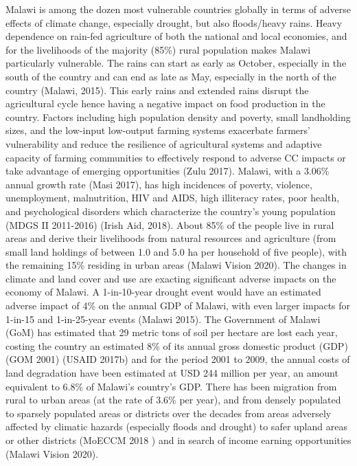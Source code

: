 \documentclass[
]{book}
\begin{document}
Malawi is among the dozen most vulnerable countries globally in terms of adverse effects of climate change, especially drought, but also floods/heavy rains. Heavy dependence on rain-fed agriculture of both the national and local economies, and for the livelihoods of the majority (85\%) rural population makes Malawi particularly vulnerable. The rains can start as early as October, especially in the south of the country and can end as late as May, especially in the north of the country (Malawi, 2015). This early rains and extended rains disrupt the agricultural cycle hence having a negative impact on food production in the country. Factors including high population density and poverty, small landholding sizes, and the low-input low-output farming systems exacerbate farmers' vulnerability and reduce the resilience of agricultural systems and adaptive capacity of farming communities to effectively respond to adverse CC impacts or take advantage of emerging opportunities (Zulu 2017). Malawi, with a 3.06\% annual growth rate (Masi 2017), has high incidences of poverty, violence, unemployment, malnutrition, HIV and AIDS, high illiteracy rates, poor health, and psychological disorders which characterize the country's young population (MDGS II 2011-2016) (Irish Aid, 2018). About 85\% of the people live in rural areas and derive their livelihoods from natural resources and agriculture (from small land holdings of between 1.0 and 5.0 ha per household of five people), with the remaining 15\% residing in urban areas (Malawi Vision 2020). The changes in climate and land cover and use are exacting significant adverse impacts on the economy of Malawi. A 1-in-10-year drought event would have an estimated adverse impact of 4\% on the annual GDP of Malawi, with even larger impacts for 1-in-15 and 1-in-25-year events (Malawi 2015). The Government of Malawi (GoM) has estimated that 29 metric tons of soil per hectare are lost each year, costing the country an estimated 8\% of its annual gross domestic product (GDP) (GOM 2001) (USAID 2017b) and for the period 2001 to 2009, the annual costs of land degradation have been estimated at USD 244 million per year, an amount equivalent to 6.8\% of Malawi's country's GDP. There has been migration from rural to urban areas (at the rate of 3.6\% per year), and from densely populated to sparsely populated areas or districts over the decades from areas adversely affected by climatic hazards (especially floods and drought) to safer upland areas or other districts (MoECCM 2018 ) and in search of income earning opportunities (Malawi Vision 2020).
\end{document}
